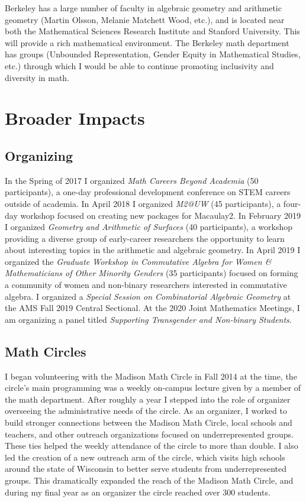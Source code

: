 \documentclass[11pt,reqno]{amsart}
\theoremstyle{remark}
\begin{document}
Berkeley has a large number of faculty in algebraic geometry and arithmetic geometry (Martin Olsson, Melanie Matchett Wood, etc.), and is located near both the Mathematical Sciences Research Institute and Stanford University. This will provide a rich mathematical environment. The Berkeley math department has groups (Unbounded Representation, Gender Equity in Mathematical Studies, etc.) through which I would be able to continue promoting inclusivity and diversity in math. 

\section{Broader Impacts}

\subsection{Organizing}
In the Spring of 2017 I organized \textit{Math Careers Beyond Academia } (50 participants), a one-day professional development conference on STEM careers outside of academia. In April 2018 I organized \textit{M2@UW} (45 participants), a four-day workshop focused on creating new packages for Macaulay2. In February 2019 I organized \textit{Geometry and Arithmetic of Surfaces} (40 participants), a workshop providing a diverse group of early-career researchers the opportunity to learn about interesting topics in the arithmetic and algebraic geometry. In April 2019 I organized the \textit{Graduate Workshop in Commutative Algebra for Women \& Mathematicians of Other Minority Genders} (35 participants)  focused on forming a community of women and non-binary researchers interested in commutative algebra. I organized a \textit{Special Session on Combinatorial Algebraic Geometry} at the AMS Fall 2019 Central Sectional. At the 2020 Joint Mathematics Meetings, I am organizing a panel titled \textit{Supporting Transgender and Non-binary Students}. 

\subsection{Math Circles}
I began volunteering with the Madison Math Circle in Fall 2014 at the time, the circle's main programming was a weekly on-campus lecture given by a member of the math department. After roughly a year I stepped into the role of organizer overseeing the administrative needs of the circle. As an organizer, I worked to build stronger connections between the Madison Math Circle, local schools and teachers, and other outreach organizations focused on underrepresented groups. These ties helped the weekly attendance of the circle to more than double. I also led the creation of a new outreach arm of the circle, which visits high schools around the state of Wisconsin to better serve students from underrepresented groups. This dramatically expanded the reach of the Madison Math Circle, and during my final year as an organizer the circle reached over 300 students.
\end{document}
